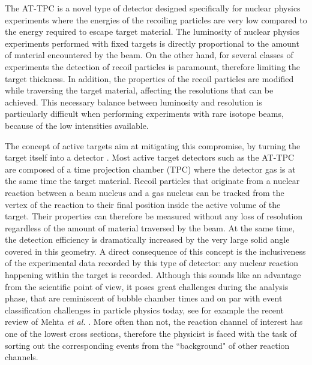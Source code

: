 \documentclass[review,number,sort&compress]{elsarticle}
\begin{document}
The AT-TPC \cite{Bradt2017} is a novel type of detector designed specifically for nuclear physics experiments where the energies of the recoiling particles are very low compared to the energy required to escape target material. The luminosity of nuclear physics experiments performed with fixed targets is directly proportional to the amount of material encountered by the beam. On the other hand, for several classes of experiments the detection of recoil particles is paramount, therefore limiting the target thickness. In addition, the properties of the recoil particles are modified while traversing the target material, affecting the resolutions that can be achieved. This necessary balance between luminosity and resolution is particularly difficult when performing experiments with rare isotope beams, because of the low intensities available. 

The concept of active targets aim at mitigating this compromise, by turning the target itself into a detector \cite{BECEIRONOVO2015}. Most active target detectors such as the AT-TPC are composed of a time projection chamber (TPC) where the detector gas is at the same time the target material. Recoil particles that originate from a nuclear reaction between a beam nucleus and a gas nucleus can be tracked from the vertex of the reaction to their final position inside the active volume of the target. Their properties can therefore be measured without any loss of resolution regardless of the amount of material traversed by the beam. At the same time, the detection efficiency is dramatically increased by the very large solid angle covered in this geometry. A direct consequence of this concept is the inclusiveness of the experimental data recorded by this type of detector: any nuclear reaction happening within the target is recorded. Although this sounds like an advantage from the scientific point of view, it poses great challenges during the analysis phase, that are reminiscent of bubble chamber times and on par with event classification challenges in particle physics today, see for example the recent review of Mehta {\em et al.} \cite{mehta2019}. More often than not, the reaction channel of interest has one of the lowest cross sections, therefore the physicist is faced with the task of sorting out the corresponding events from the ``background" of other reaction channels. 
\end{document}
